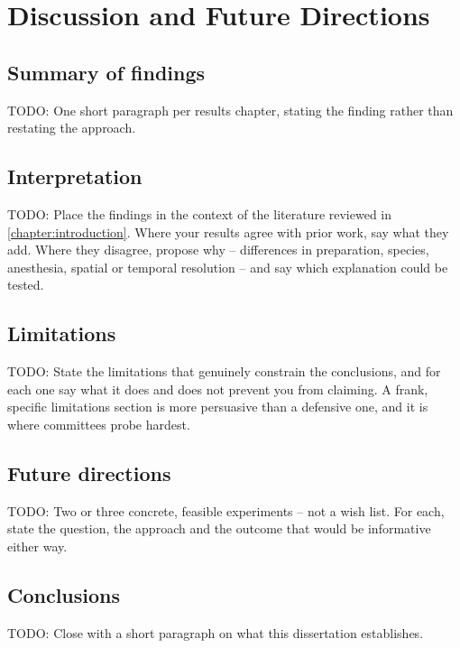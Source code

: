 \chapter{Discussion and Future Directions}\label{chapter:discussion}
\thispagestyle{myheadings}


	\section{Summary of findings}\label{section:discussion:summary}

		TODO: One short paragraph per results chapter, stating the finding
		rather than restating the approach.

	\section{Interpretation}\label{section:discussion:interpretation}

		TODO: Place the findings in the context of the literature reviewed in
		\cref{chapter:introduction}. Where your results agree with prior work,
		say what they add. Where they disagree, propose why -- differences in
		preparation, species, anesthesia, spatial or temporal resolution -- and
		say which explanation could be tested.

	\section{Limitations}\label{section:discussion:limitations}

		TODO: State the limitations that genuinely constrain the conclusions,
		and for each one say what it does and does not prevent you from
		claiming. A frank, specific limitations section is more persuasive than
		a defensive one, and it is where committees probe hardest.

	\section{Future directions}\label{section:discussion:future}

		TODO: Two or three concrete, feasible experiments -- not a wish list.
		For each, state the question, the approach and the outcome that would
		be informative either way.

	\section{Conclusions}\label{section:discussion:conclusions}

		TODO: Close with a short paragraph on what this dissertation
		establishes.
